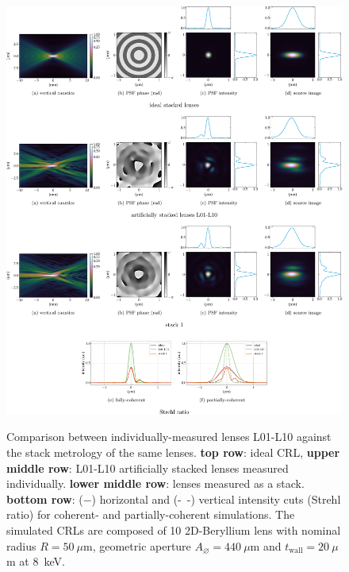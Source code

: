 \begin{refsection}
\clearpage

\begin{figure}[t]
        \centering
        {\includegraphics[width=1\linewidth]{figures/ch05/CDn_vs_CDnStack.pdf}}
        \caption[Artificially stacked lenses L01-L11 vs. stack 1 comparison]{Comparison between individually-measured lenses L01-L10 against the stack metrology of the same lenses. \textbf{top row}: ideal CRL, \textbf{upper middle row}: L01-L10 artificially stacked lenses measured individually. \textbf{lower middle row}: lenses measured as a stack. \textbf{bottom row}: ($-$) horizontal and (-~-) vertical intensity cuts (Strehl ratio) for coherent- and partially-coherent simulations. The simulated CRLs are composed of 10 2D-Beryllium lens with nominal radius $R=50~\mu\text{m}$, geometric aperture $A_{\diameter}=440~\mu\text{m}$ and $t_\text{wall}=20~\mu$m at 8~keV.}\label{fig:CDn_vs_CDnStack}
\end{figure}


\end{refsection}
